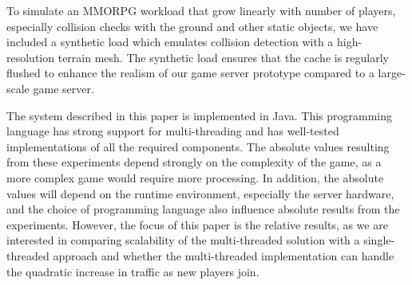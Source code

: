 

To simulate an MMORPG workload that grow linearly with number of
players, especially collision checks with the ground and other static
objects, we have included a synthetic load which emulates collision
detection with a high-resolution terrain mesh. The synthetic load
ensures that the cache is regularly flushed
to enhance the realism of our game server prototype compared to a
large-scale game server.

The system described in this paper is implemented in Java. This
programming language has strong support for multi-threading and has
well-tested implementations of all the required components. The
absolute values resulting from these experiments depend strongly on
the complexity of the game, as a more complex game would require more
processing. In addition, the absolute values will depend on the runtime
environment, especially the server hardware, and the choice of programming
language also influence absolute results from the
experiments. However, the focus of this paper is the relative results,
as we are interested in comparing scalability of the multi-threaded
solution with a single-threaded approach and whether the
multi-threaded implementation can handle the quadratic increase in
traffic as new players join.
